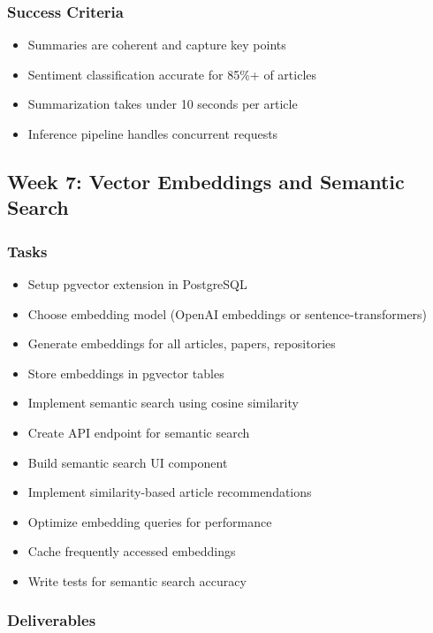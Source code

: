 \documentclass[12pt,oneside]{report}
\begin{document}
\subsubsection{Success Criteria}

\begin{itemize}
    \item Summaries are coherent and capture key points
    \item Sentiment classification accurate for 85\%+ of articles
    \item Summarization takes under 10 seconds per article
    \item Inference pipeline handles concurrent requests
\end{itemize}

\subsection{Week 7: Vector Embeddings and Semantic Search}

\subsubsection{Tasks}

\begin{itemize}
    \item Setup pgvector extension in PostgreSQL
    \item Choose embedding model (OpenAI embeddings or sentence-transformers)
    \item Generate embeddings for all articles, papers, repositories
    \item Store embeddings in pgvector tables
    \item Implement semantic search using cosine similarity
    \item Create API endpoint for semantic search
    \item Build semantic search UI component
    \item Implement similarity-based article recommendations
    \item Optimize embedding queries for performance
    \item Cache frequently accessed embeddings
    \item Write tests for semantic search accuracy
\end{itemize}

\subsubsection{Deliverables}
\end{document}
